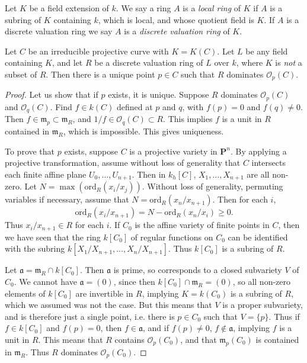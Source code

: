 Let $K$ be a field extension of $k$. We say a ring $A$ is a \emph{local ring} of $K$ if $A$ is a subring of $K$ containing $k$, which is local, and whose quotient field is $K$. If $A$ is a discrete valuation ring we say $A$ is a \emph{discrete valuation ring} of $K$.

\begin{theorem}
    Let $C$ be an irreducible projective curve with $K = K(C)$. Let $L$ be any field containing $K$, and let $R$ be a discrete valuation ring of $L$ over $k$, where $K$ is \emph{not} a subset of $R$. Then there is a unique point $p \in C$ such that $R$ dominates $\mathcal{O}_p(C)$.
\end{theorem}
\begin{proof}
    Let us show that if $p$ exists, it is unique. Suppose $R$ dominates $\mathcal{O}_p(C)$ and $\mathcal{O}_q(C)$. Find $f \in k(C)$ defined at $p$ and $q$, with $f(p) = 0$ and $f(q) \neq 0$. Then $f \in \mathfrak{m}_p \subset \mathfrak{m}_R$, and $1/f \in \mathcal{O}_q(C) \subset R$. This implies $f$ is a unit in $R$ contained in $\mathfrak{m}_R$, which is impossible. This gives uniqueness.

    To prove that $p$ exists, suppose $C$ is a projective variety in $\mathbf{P}^n$. By applying a projective transformation, assume without loss of generality that $C$ intersects each finite affine plane $U_0,\dots,U_{n+1}$. Then in $k_h[C]$, $X_1,\dots,X_{n+1}$ are all non-zero. Let $N = \max(\text{ord}_R(x_i/x_j))$. Without loss of generality, permuting variables if necessary, assume that $N = \text{ord}_R(x_n/x_{n+1})$. Then for each $i$,
    \[ \text{ord}_R(x_i/x_{n+1}) = N - \text{ord}_R(x_n/x_i) \geq 0. \]
    Thus $x_i/x_{n+1} \in R$ for each $i$. If $C_0$ is the affine variety of finite points in $C$, then we have seen that the ring $k[C_0]$ of regular functions on $C_0$ can be identified with the subring $k[X_1/X_{n+1},\dots,X_n/X_{n+1}]$. Thus $k[C_0]$ is a subring of $R$.

    Let $\mathfrak{a} = \mathfrak{m}_R \cap k[C_0]$. Then $\mathfrak{a}$ is prime, so corresponds to a closed subvariety $V$ of $C_0$. We cannot have $\mathfrak{a} = (0)$, since then $k[C_0] \cap \mathfrak{m}_R = (0)$, so all non-zero elements of $k[C_0]$ are invertible in $R$, implying $K = k(C_0)$ is a subring of $R$, which we assumed was not the case. But this means that $V$ is a proper subvariety, and is therefore just a single point, i.e. there is $p \in C_0$ such that $V = \{ p \}$. Thus if $f \in k[C_0]$ and $f(p) = 0$, then $f \in \mathfrak{a}$, and if $f(p) \neq 0$, $f \not \in \mathfrak{a}$, implying $f$ is a unit in $R$. This means that $R$ contains $\mathcal{O}_p(C_0)$, and that $\mathfrak{m}_p(C_0)$ is contained in $\mathfrak{m}_R$. Thus $R$ dominates $\mathcal{O}_p(C_0)$.
\end{proof}

